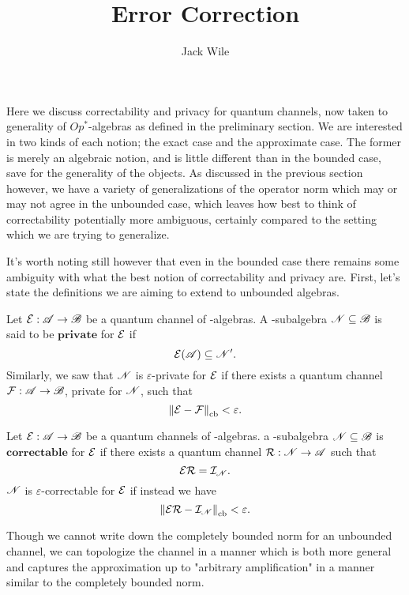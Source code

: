 \documentclass[../main.tex]{subfiles}
\title{Error Correction}
\author{Jack Wile}
\date{}
\begin{document}
Here we discuss correctability and privacy for quantum channels, now taken
to generality of $Op^*$-algebras as defined in the preliminary section. We
are interested in two kinds of each notion; the exact case and the 
approximate case. The former is merely an algebraic notion, and is little 
different than in the bounded case, save for the generality of the objects.
As discussed in the previous section however, we have a variety of 
generalizations of the operator norm which may or may not agree in the 
unbounded case, which leaves how best to think of correctability 
potentially more ambiguous, certainly compared to the setting which we are
trying to generalize.

It's worth noting still however that even in the bounded case there remains
some ambiguity with what the best notion of correctability and privacy are. First, let's state the definitions we are aiming to extend to unbounded 
algebras.

\begin{definition}

	Let $\mathcal{E}: \mathscr{A} \to \mathscr{B}$ be a quantum channel of \cstar-algebras. A
	\cstar-subalgebra $\mathscr{N} \subseteq \mathscr{B}$ is said to be $\textbf{private}$
	for $\mathcal{E}$ if \[\mathcal{E}(\mathscr{A}) \subseteq \mathscr{N}'.\] Similarly, we saw that 
	$\mathscr{N}$ is $\varepsilon$-private for $\mathcal{E}$ if there exists a 
	quantum channel $\mathcal{F}: \mathscr{A} \to \mathscr{B}$, private for $\mathscr{N}$, such that 
	\[\left\lVert\mathcal{E} - \mathcal{F}\right\rVert_{\text{cb}} < \varepsilon.\]

\end{definition}

\begin{definition}

	Let $\mathcal{E}: \mathscr{A} \to \mathscr{B}$ be a quantum channels of \cstar-algebras. 
	a \cstar-subalgebra $\mathscr{N} \subseteq \mathscr{B}$ is $\textbf{correctable}$
	for $\mathcal{E}$ if there exists a quantum channel $\mathcal{R}: \mathscr{N} \to \mathscr{A}$ 
	such that \[\mathcal{E}\mathcal{R} = \mathcal{I}_\mathscr{N}.\] $\mathscr{N}$ is $\varepsilon$-correctable
	for $\mathcal{E}$ if instead we have 
	\[\left\lVert\mathcal{E}\mathcal{R} - \mathcal{I}_\mathscr{N}\right\rVert_{\text{cb}} < \varepsilon.\]

\end{definition}

Though we cannot write down the completely bounded norm for an unbounded channel, we can
topologize the channel in a manner which is both more general and captures the 
approximation up to "arbitrary amplification" in a manner similar to the completely 
bounded norm.
\end{document}
